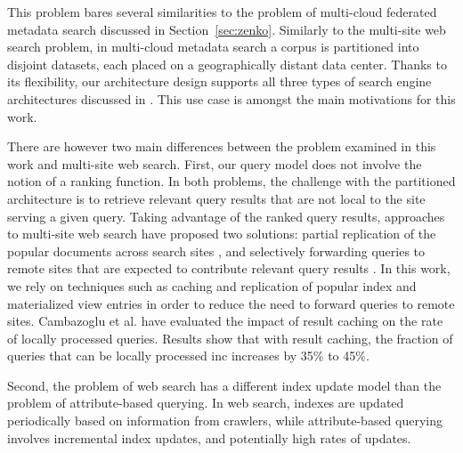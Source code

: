 This problem bares several similarities to the problem of multi-cloud federated metadata search discussed in Section~\ref{sec:zenko}.
Similarly to the multi-site web search problem,
in multi-cloud metadata search a corpus is partitioned into disjoint datasets, each placed on a geographically distant
data center.
Thanks to its flexibility, our architecture design supports all three types of search engine architectures discussed in
\cite{cambazoglu:multisitequantifying}.
This use case is amongst the main motivations for this work.

\bigskip
\noindent
There are however two main differences between the problem examined in this work and multi-site web search.
First, our query model does not involve the notion of a ranking function.
In both problems, the challenge with the partitioned architecture is to retrieve relevant query results that are not
local to the site serving a given query.
Taking advantage of the ranked query results, approaches to multi-site web search have proposed two solutions:
partial replication of the popular documents across search sites \cite{frances:multisiteefficiency},
and selectively forwarding queries to remote sites that are expected to contribute relevant query results
\cite{yates:multisitefeasibility, cambazoglu:multisiteforwarding}.
In this work, we rely on techniques such as caching and replication of popular index and materialized view entries in
order to reduce the need to forward queries to remote sites.
Cambazoglu et al. \cite{cambazoglu:multisiteforwarding} have evaluated the impact of result caching
on the rate of locally processed queries.
Results show that with result caching, the fraction of queries that can be locally processed inc increases by 35\% to 45\%.

Second, the problem of web search has a different index update model than the problem of attribute-based querying.
In web search, indexes are updated periodically based on information from crawlers,
while attribute-based querying involves incremental index updates,
and potentially high rates of updates.


